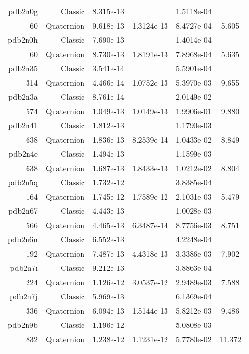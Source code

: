 \begin{xltabular}{\textwidth}{r|rS[table-format=1.3e+2]S[table-format=1.4e+2]S[table-format=1.4e+2]S[table-format=-1.3]}
pdb2n0g & Classic & 8.315e-13 &  & 1.5118e-04 & \\
60 & Quaternion & 9.618e-13 & 1.3124e-13 & 8.4727e-04 & 5.605\\  \addlinespace
pdb2n0h & Classic & 7.690e-13 &  & 1.4014e-04 & \\
60 & Quaternion & 8.730e-13 & 1.8191e-13 & 7.8968e-04 & 5.635\\  \addlinespace
pdb2n35 & Classic & 3.541e-14 &  & 5.5901e-04 & \\
314 & Quaternion & 4.466e-14 & 1.0752e-13 & 5.3970e-03 & 9.655\\  \addlinespace
pdb2n3a & Classic & 8.761e-14 &  & 2.0149e-02 & \\
574 & Quaternion & 1.049e-13 & 1.0149e-13 & 1.9906e-01 & 9.880\\  \addlinespace
pdb2n41 & Classic & 1.812e-13 &  & 1.1790e-03 & \\
638 & Quaternion & 1.836e-13 & 8.2539e-14 & 1.0433e-02 & 8.849\\  \addlinespace
pdb2n4e & Classic & 1.494e-13 &  & 1.1599e-03 & \\
638 & Quaternion & 1.687e-13 & 1.8433e-13 & 1.0212e-02 & 8.804\\  \addlinespace
pdb2n5q & Classic & 1.732e-12 &  & 3.8385e-04 & \\
164 & Quaternion & 1.745e-12 & 1.7589e-12 & 2.1031e-03 & 5.479\\  \addlinespace
pdb2n67 & Classic & 4.443e-13 &  & 1.0028e-03 & \\
566 & Quaternion & 4.465e-13 & 6.3487e-14 & 8.7756e-03 & 8.751\\  \addlinespace
pdb2n6n & Classic & 6.552e-13 &  & 4.2248e-04 & \\
192 & Quaternion & 7.487e-13 & 4.4318e-13 & 3.3386e-03 & 7.902\\  \addlinespace
pdb2n7i & Classic & 9.212e-13 &  & 3.8863e-04 & \\
224 & Quaternion & 1.126e-12 & 3.0537e-12 & 2.9489e-03 & 7.588\\  \addlinespace
pdb2n7j & Classic & 5.969e-13 &  & 6.1369e-04 & \\
336 & Quaternion & 6.094e-13 & 1.5144e-13 & 5.8212e-03 & 9.486\\  \addlinespace
pdb2n9b & Classic & 1.196e-12 &  & 5.0808e-03 & \\
832 & Quaternion & 1.238e-12 & 1.1231e-12 & 5.7780e-02 & 11.372\\  \addlinespace

\end{xltabular}
